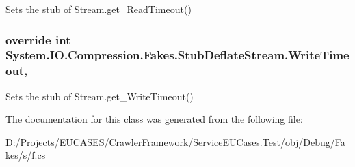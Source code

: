 Sets the stub of Stream.\-get\-\_\-\-Read\-Timeout()

\hypertarget{class_system_1_1_i_o_1_1_compression_1_1_fakes_1_1_stub_deflate_stream_a65da4934280057e00100a1ecdc793b9b}{
\subsubsection[{Write\-Timeout}]{\setlength{\rightskip}{0pt plus 5cm}override int System.\-I\-O.\-Compression.\-Fakes.\-Stub\-Deflate\-Stream.\-Write\-Timeout\hspace{0.3cm}{\ttfamily [get]}, {\ttfamily [set]}}}\label{class_system_1_1_i_o_1_1_compression_1_1_fakes_1_1_stub_deflate_stream_a65da4934280057e00100a1ecdc793b9b}


Sets the stub of Stream.\-get\-\_\-\-Write\-Timeout()



The documentation for this class was generated from the following file\-:\begin{DoxyCompactItemize}
\item 
D\-:/\-Projects/\-E\-U\-C\-A\-S\-E\-S/\-Crawler\-Framework/\-Service\-E\-U\-Cases.\-Test/obj/\-Debug/\-Fakes/s/\hyperlink{s_2f_8cs}{f.\-cs}\end{DoxyCompactItemize}
